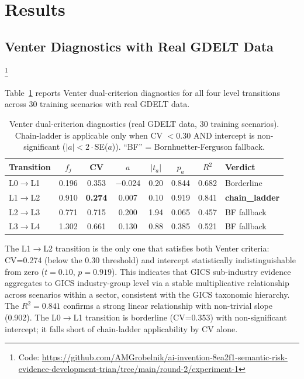 \documentclass[11pt,letterpaper]{article}
\begin{document}
\section{Results}
\label{sec:results}

\subsection{Venter Diagnostics with Real GDELT Data}%
\footnote{Code: \url{https://github.com/AMGrobelnik/ai-invention-8ea2f1-semantic-risk-evidence-development-trian/tree/main/round-2/experiment-1}}

Table~\ref{tab:venter} reports Venter dual-criterion diagnostics for all four level transitions across 30 training scenarios with real GDELT data.

\begin{table}[!htbp]
\centering
\caption{Venter dual-criterion diagnostics (real GDELT data, 30 training scenarios). Chain-ladder is applicable only when CV $< 0.30$ AND intercept is non-significant ($|a| < 2\cdot$SE($a$)). ``BF'' = Bornhuetter-Ferguson fallback.}
\label{tab:venter}
\begin{tabular}{lccccccl}
\toprule
Transition & $f_j$ & CV & $a$ & $|t_a|$ & $p_a$ & $R^2$ & Verdict \\
\midrule
L0$\to$L1 & 0.196 & 0.353 & $-$0.024 & 0.20 & 0.844 & 0.682 & Borderline \\
L1$\to$L2 & 0.910 & \textbf{0.274} & 0.007 & 0.10 & 0.919 & 0.841 & \textbf{chain\_ladder} \\
L2$\to$L3 & 0.771 & 0.715 & 0.200 & 1.94 & 0.065 & 0.457 & BF fallback \\
L3$\to$L4 & 1.302 & 0.661 & 0.130 & 0.88 & 0.385 & 0.521 & BF fallback \\
\bottomrule
\end{tabular}
\end{table}

The L1$\to$L2 transition is the only one that satisfies both Venter criteria: CV=0.274 (below the 0.30 threshold) and intercept statistically indistinguishable from zero ($t=0.10$, $p=0.919$). This indicates that GICS sub-industry evidence aggregates to GICS industry-group level via a stable multiplicative relationship across scenarios within a sector, consistent with the GICS taxonomic hierarchy. The $R^2=0.841$ confirms a strong linear relationship with non-trivial slope (0.902). The L0$\to$L1 transition is borderline (CV=0.353) with non-significant intercept; it falls short of chain-ladder applicability by CV alone.
\end{document}
